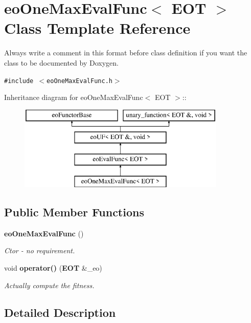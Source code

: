 \section{eo\-One\-Max\-Eval\-Func$<$ EOT $>$ Class Template Reference}
\label{classeo_one_max_eval_func}
Always write a comment in this format before class definition if you want the class to be documented by Doxygen.  


{\tt \#include $<$eo\-One\-Max\-Eval\-Func.h$>$}

Inheritance diagram for eo\-One\-Max\-Eval\-Func$<$ EOT $>$::\begin{figure}[H]
\begin{center}
\leavevmode
\includegraphics[height=4cm]{classeo_one_max_eval_func}
\end{center}
\end{figure}
\subsection*{Public Member Functions}
\begin{CompactItemize}
\item 
{\bf eo\-One\-Max\-Eval\-Func} ()\label{classeo_one_max_eval_func_a0}

\begin{CompactList}\small\item\em Ctor - no requirement. \item\end{CompactList}\item 
void {\bf operator()} ({\bf EOT} \&\_\-eo)
\begin{CompactList}\small\item\em Actually compute the fitness. \item\end{CompactList}\end{CompactItemize}


\subsection{Detailed Description}
